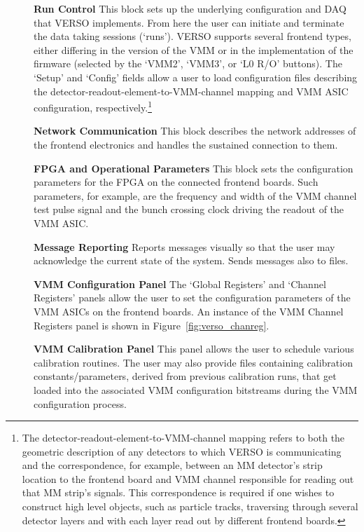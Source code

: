 \begin{description}
    \item[] \textbf{Run Control} This block sets up the underlying configuration and DAQ
        that VERSO implements.
        From here the user can initiate and terminate the data taking sessions (`runs').
        VERSO supports several frontend types, either differing in the version of the VMM or in the
            implementation of the firmware (selected by the `VMM2', `VMM3', or `L0 R/O' buttons).
        The `Setup' and `Config' fields allow a user to load configuration files describing
            the detector-readout-element-to-VMM-channel mapping and VMM ASIC configuration, respectively.\footnote{
                The detector-readout-element-to-VMM-channel mapping refers to both the geometric description
                of any detectors to which VERSO is communicating and the correspondence, for example, between an MM detector's
                strip location to the frontend board and VMM channel responsible for reading out that MM strip's signals.
                This correspondence is required if one wishes to construct high level objects, such as
                particle tracks, traversing through several detector layers and with each layer read out
                by different frontend boards.
            }
    \item[] \textbf{Network Communication} This block describes the network addresses of the
        frontend electronics and handles the sustained connection to them.
    \item[] \textbf{FPGA and Operational Parameters} This block sets the configuration parameters
            for the FPGA on the connected frontend boards. Such parameters, for example,
            are the frequency and width of the VMM channel test pulse signal and the bunch
            crossing clock driving the readout of the VMM ASIC.
    \item[] \textbf{Message Reporting} Reports messages visually so that the user may acknowledge
            the current state of the system. Sends messages also to files.
    \item[] \textbf{VMM Configuration Panel} The `Global Registers' and `Channel Registers' panels allow
        the user to set the configuration parameters of the VMM ASICs on the frontend boards.
        An instance of the VMM Channel Registers panel is shown in Figure~\ref{fig:verso_chanreg}.
    \item[] \textbf{VMM Calibration Panel} This panel allows the user to schedule various calibration routines.
        The user may also provide files containing calibration constants/parameters, derived from previous
        calibration runs, that get loaded into the associated VMM configuration
        bitstreams during the VMM configuration process.
\end{description}

